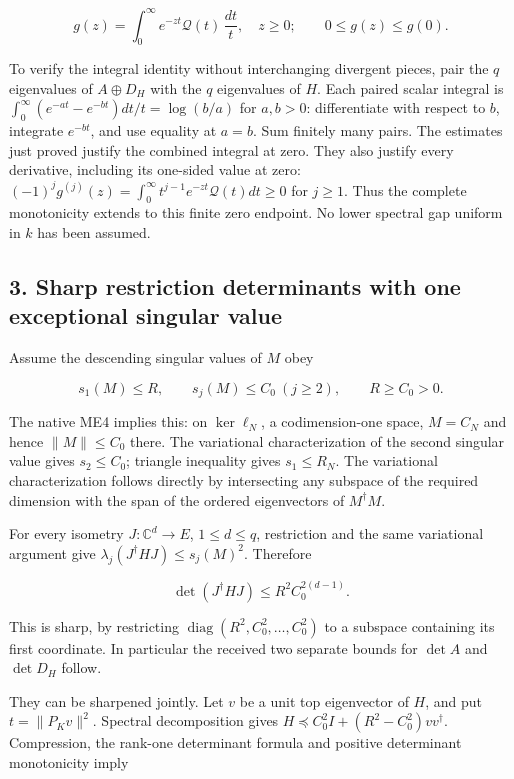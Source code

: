 \documentclass[11pt]{article}
\begin{document}
\[
\boxed{g(z)=\int_0^\infty e^{-zt}\mathcal Q(t)\,\frac{dt}{t},\quad z\ge0;\qquad
0\le g(z)\le g(0).}
\tag{ME10}
\]

To verify the integral identity without interchanging divergent pieces, pair the \(q\) eigenvalues of \(A\oplus D_H\) with the \(q\) eigenvalues of \(H\). Each paired scalar integral is \(\int_0^\infty(e^{-at}-e^{-bt})dt/t=\log(b/a)\) for \(a,b>0\): differentiate with respect to \(b\), integrate \(e^{-bt}\), and use equality at \(a=b\). Sum finitely many pairs. The estimates just proved justify the combined integral at zero. They also justify every derivative, including its one-sided value at zero: \((-1)^jg^{(j)}(z)=\int_0^\infty t^{j-1}e^{-zt}\mathcal Q(t)dt\ge0\) for \(j\ge1\). Thus the complete monotonicity extends to this finite zero endpoint. No lower spectral gap uniform in \(k\) has been assumed.

\subsection{3. Sharp restriction determinants with one exceptional singular value}\label{sharp-restriction-determinants-with-one-exceptional-singular-value}

Assume the descending singular values of \(M\) obey

\[
s_1(M)\le R,\qquad s_j(M)\le C_0\ (j\ge2),\qquad R\ge C_0>0.
\tag{ME11}
\]

The native ME4 implies this: on \(\ker\ell_N\), a codimension-one space, \(M=C_N\) and hence \(\|M\|\le C_0\) there. The variational characterization of the second singular value gives \(s_2\le C_0\); triangle inequality gives \(s_1\le R_N\). The variational characterization follows directly by intersecting any subspace of the required dimension with the span of the ordered eigenvectors of \(M^\dagger M\).

For every isometry \(J:\mathbb C^d\to E\), \(1\le d\le q\), restriction and the same variational argument give \(\lambda_j(J^\dagger HJ)\le s_j(M)^2\). Therefore

\[
\boxed{\det(J^\dagger HJ)\le R^2C_0^{2(d-1)}.}
\tag{ME12}
\]

This is sharp, by restricting \(\operatorname{diag}(R^2,C_0^2,\ldots,C_0^2)\) to a subspace containing its first coordinate. In particular the received two separate bounds for \(\det A\) and \(\det D_H\) follow.

They can be sharpened jointly. Let \(v\) be a unit top eigenvector of \(H\), and put \(t=\|P_Kv\|^2\). Spectral decomposition gives \(H\preceq C_0^2I+(R^2-C_0^2)vv^\dagger\). Compression, the rank-one determinant formula and positive determinant monotonicity imply
\end{document}
